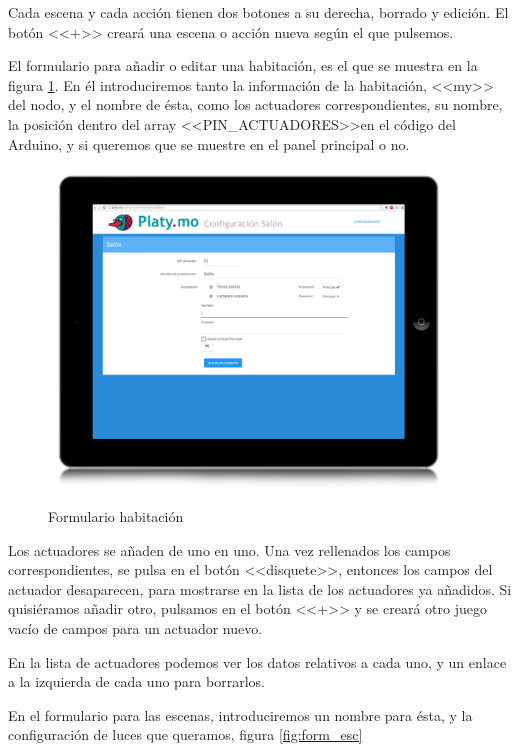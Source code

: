     Cada escena y cada acción tienen dos botones a su derecha, borrado y edición. El botón <<+>> creará una escena o acción nueva según el que pulsemos.
    
    El formulario para añadir o editar una habitación, es el que se muestra en la figura \ref{fig:form_hab}. En él introduciremos tanto la información de la habitación, <<my>> del nodo, y el nombre de ésta, como los actuadores correspondientes, su nombre, la posición dentro del array <<PIN\_ACTUADORES>>en el código del Arduino, y si queremos que se muestre en el panel principal o no.
    
    
    
        \begin{figure}[h!]
            \centering
            \includegraphics[width=0.95\textwidth]{imagenes/conf_hab.jpg}
            \caption{Formulario habitación}
            \label{fig:form_hab}
        \end{figure}
        
     Los actuadores se añaden de uno en uno. Una vez rellenados los campos correspondientes, se pulsa en el botón <<disquete>>, entonces los campos del actuador desaparecen, para mostrarse en la lista de los actuadores ya añadidos. Si quisiéramos añadir otro, pulsamos en el botón <<+>> y se creará otro juego vacío de campos para un actuador nuevo.
     
     En la lista de actuadores podemos ver los datos relativos a cada uno, y un enlace a la izquierda de cada uno para borrarlos.
     
          
     En el formulario para las escenas, introduciremos un nombre para ésta, y la configuración de luces que queramos, figura \ref{fig:form_esc}
    
